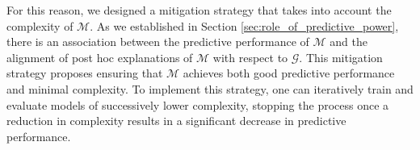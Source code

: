 \documentclass[12pt]{article}  %
\newcommand{\tw}[1]{\textcolor{red}{Tong: #1}}
\begin{document}
            
            For this reason, we designed a mitigation strategy that takes into account the complexity of $\mathcal{M}$. As we established in Section \ref{sec:role_of_predictive_power}, there is an association between the predictive performance of $\mathcal{M}$ and the alignment of post hoc explanations of $\mathcal{M}$ with respect to $\mathcal{G}$. This mitigation strategy proposes ensuring that $\mathcal{M}$ achieves both good predictive performance and minimal complexity.
            To implement this strategy, one can iteratively train and evaluate models of successively lower complexity, stopping the process once a reduction in complexity results in a significant decrease in predictive performance.
\end{document}
